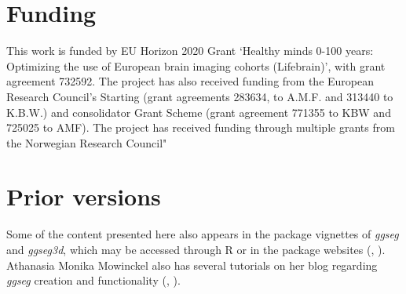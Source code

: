 \documentclass[fleqn,10pt]{wlpeerj} %
\begin{document}
\hypertarget{funding}{%
\section{Funding}\label{funding}}

This work is funded by EU Horizon 2020 Grant `Healthy minds 0-100 years: Optimizing the use of European brain imaging cohorts (Lifebrain)', with grant agreement 732592.
The project has also received funding from the European Research Council's Starting (grant agreements 283634, to A.M.F. and 313440 to K.B.W.) and consolidator Grant Scheme (grant agreement 771355 to KBW and 725025 to AMF).
The project has received funding through multiple grants from the Norwegian Research Council"

\hypertarget{prior-versions}{%
\section{Prior versions}\label{prior-versions}}

Some of the content presented here also appears in the package vignettes of \emph{ggseg} and \emph{ggseg3d}, which may be accessed through R or in the package websites (\citet{ggseg}, \citet{ggseg3d}).
Athanasia Monika Mowinckel also has several tutorials on her blog regarding \emph{ggseg} creation and functionality (\citet{ggsegAnim}, \citet{ggsegIntro}).

\renewcommand\refname{References}

\end{document}

